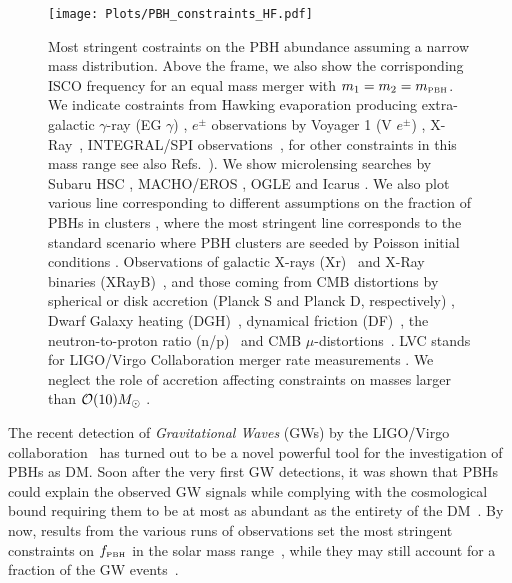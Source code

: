 \documentclass[11pt,a4paper]{article}
\begin{document}
\begin{figure}[t!]
\centering
\texttt{[image: Plots/PBH\_constraints\_HF.pdf]}
\caption{
Most stringent costraints on the PBH abundance assuming a narrow mass distribution. 
Above the frame, we also show the corrisponding ISCO frequency for an equal mass merger with $m_1 = m_2 = m_\text{\tiny PBH}$. 
We indicate costraints from Hawking evaporation producing
extra-galactic $\gamma$-ray (EG $\gamma$)
\cite{Arbey:2019vqx}, $e^\pm$ observations by Voyager 1 (V $e^\pm$) \cite{Boudaud:2018hqb}, 
X-Ray~\cite{Iguaz:2021irx},
INTEGRAL/SPI observations~\cite{Berteaud:2022tws},
for other constraints in this mass range see also Refs.~\cite{Carr:2009jm, Ballesteros:2019exr,Laha:2019ssq, Poulter:2019ooo,Dasgupta:2019cae,Laha:2020vhg,DeRocco:2019fjq,Laha:2020ivk,Kim:2020ngi}).
We show microlensing searches by Subaru HSC \cite{Niikura:2017zjd, Smyth:2019whb}, MACHO/EROS \cite{Alcock:2000kd, Allsman:2000kg}, OGLE \cite{Niikura:2019kqi} and Icarus \cite{Oguri:2017ock}. 
We also plot various line corresponding to different assumptions on the fraction of PBHs in clusters \cite{Auclair:2022lcg}, where the most stringent line corresponds to the standard scenario where PBH clusters are seeded by Poisson initial conditions \cite{Petac:2022rio,Gorton:2022fyb}.
Observations of galactic 
X-rays (Xr)~\cite{Manshanden:2018tze} and X-Ray binaries (XRayB)~\cite{Inoue:2017csr},
and those coming from CMB distortions by spherical or disk accretion (Planck S and Planck D, respectively) \cite{Ali-Haimoud:2016mbv, Serpico:2020ehh},
Dwarf Galaxy heating (DGH)~\cite{Lu:2020bmd,Takhistov:2021aqx}, dynamical friction (DF)~\cite{Carr:2018rid}, the neutron-to-proton ratio (n/p)~\cite{Inomata:2016uip} and CMB $\mu$-distortions~\cite{Nakama:2017xvq}.
LVC stands for LIGO/Virgo Collaboration merger rate measurements
\cite{Ali-Haimoud:2017rtz,Raidal:2018bbj,Vaskonen:2019jpv,DeLuca:2020bjf, Hall:2020daa,DeLuca:2020sae,Wong:2020yig,Hutsi:2020sol,DeLuca:2021wjr}.
 We neglect the role of accretion affecting constraints on masses larger than ${\cal O}(10) M_\odot$ \cite{DeLuca:2020fpg,DeLuca:2020qqa,DeLuca:2020bjf}.%
}\label{fig: Constraints}
\end{figure}


The recent detection of \textit{Gravitational Waves} (GWs) by the LIGO/Virgo collaboration~\cite{TheLIGOScientific:2014jea,TheVirgo:2014hva} has turned out to be a novel powerful tool for the investigation of PBHs as DM. 
Soon after the very first GW detections, it was shown that PBHs could explain the observed GW signals while complying with the cosmological bound requiring them to be at most as abundant as the entirety of the DM~\cite{Bird:2016dcv,Clesse:2016vqa,Sasaki:2016jop}. 
By now, results from the various runs of observations set the most stringent constraints on $f_\text{\tiny PBH}$ in the solar mass range~\cite{Ali-Haimoud:2017rtz,Raidal:2018bbj,Vaskonen:2019jpv,DeLuca:2020bjf, Hall:2020daa,DeLuca:2020sae,Wong:2020yig,Hutsi:2020sol,DeLuca:2021wjr}, 
while they may still account for a fraction of the GW events~\cite{Franciolini:2021tla,Franciolini:2021xbq,Franciolini:2022iaa}. 
\end{document}
